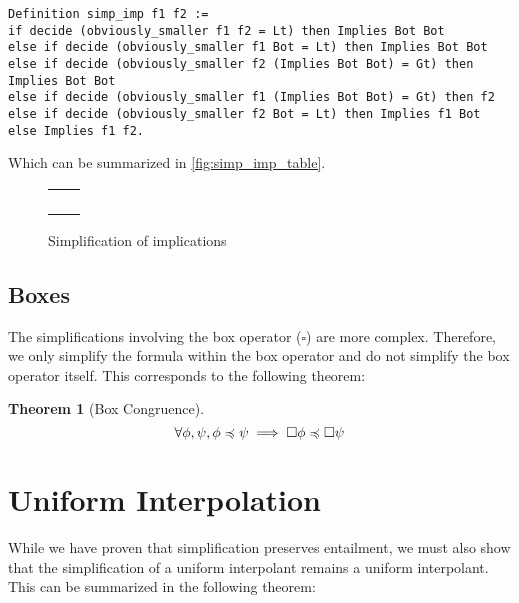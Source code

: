 \documentclass{article}
\newtheorem{theorem}{Theorem}[section]
\begin{document}
\begin{lstlisting}[language=Coq]
Definition simp_imp f1 f2 :=
if decide (obviously_smaller f1 f2 = Lt) then Implies Bot Bot
else if decide (obviously_smaller f1 Bot = Lt) then Implies Bot Bot
else if decide (obviously_smaller f2 (Implies Bot Bot) = Gt) then Implies Bot Bot
else if decide (obviously_smaller f1 (Implies Bot Bot) = Gt) then f2
else if decide (obviously_smaller f2 Bot = Lt) then Implies f1 Bot
else Implies f1 f2.
\end{lstlisting}

Which can be summarized in \autoref{fig:simp_imp_table}.

\begin{figure}[H]
	\centering
	\begin{tabular}{|C|C|}
		\hline
		\phi \prelt \psi & \phi \rightarrow \psi \equiv \top      \\
		\hline
		\phi \prelt \bot & \phi \rightarrow \psi \equiv \top      \\
		\hline
		\psi \prelt \top & \phi \rightarrow \psi \equiv \top      \\
		\hline
		\phi \prelt \top & \phi \rightarrow \psi \equiv \psi      \\
		\hline
		\psi \prelt \bot & \phi \rightarrow \psi \equiv \neg \phi \\
		\hline
	\end{tabular}
	\caption{Simplification of implications}
	\label{fig:simp_imp_table}
\end{figure}

\subsection{Boxes}

The simplifications involving the box operator ($\square$) are more complex. Therefore, we only simplify the formula within
the box operator and do not simplify the box operator itself. This corresponds to the following theorem:

\begin{theorem}[Box Congruence]
	\[
		\forall \phi, \psi, \phi \preccurlyeq \psi \implies \square \phi \preccurlyeq \square \psi
	\]
\end{theorem}

\section{Uniform Interpolation}

While we have proven that simplification preserves entailment, we must also show that the simplification of a uniform
interpolant remains a uniform interpolant. This can be summarized in the following theorem:
\end{document}
